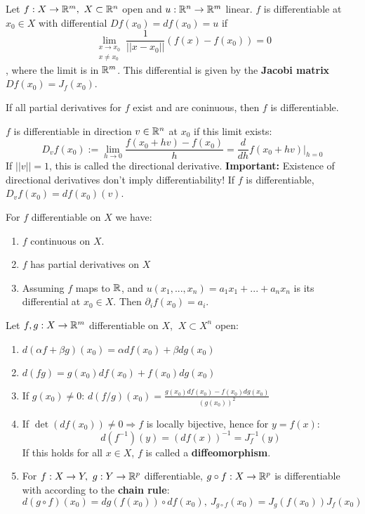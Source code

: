 \begin{definition}[Differential]
	Let $f: X \to \mathbb{R}^m, \  X \subset \mathbb{R}^n $ open and $u: \mathbb{R}^n \to \mathbb{R}^m$ linear.
	$f$ is differentiable at $x_0 \in X$ with differential $Df(x_0) = df(x_0) = u$ if
	$$\lim_{\substack{x \to x_0 \\ x \neq x_0}} \frac{1}{||x-x_0||}(f(x) - f(x_0)) = 0$$
	, where the limit is in $\mathbb{R}^m$.
	This differential is given by the \textbf{Jacobi matrix} $Df(x_0) = J_f(x_0)$.
\end{definition}

\begin{theorem}
	If all partial derivatives for $f$ exist and are coninuous, then $f$ is differentiable.
\end{theorem}

\begin{definition}
	$f$ is differentiable in direction $v\in \mathbb{R}^n$ at $x_0$ if this limit exists:
	$$D_vf(x_0) := \lim_{h\to 0} \frac{f(x_0 + hv) - f(x_0)}{h} = \frac{d}{dh}f(x_0 + hv)|_{h=0}$$
	If $||v|| = 1$, this is called the directional derivative.
	\textbf{Important:} Existence of directional derivatives don't imply differentiability!
	If $f$ is differentiable, $D_vf(x_0) = df(x_0)(v)$.
\end{definition}

\begin{proposition}
	For $f$ differentiable on $X$ we have:
	\begin{enumerate}
		\item $f$ continuous on $X$.
		\item $f$ has partial derivatives on $X$
		\item Assuming $f$ maps to $\mathbb{R}$, and $u(x_1,...,x_n) = a_1x_1 + ... + a_nx_n$ is its differential at $x_0 \in X$.
			Then $\partial_if(x_0) = a_i$.
	\end{enumerate}
\end{proposition}

\begin{proposition}
	Let $f, g: X \to \mathbb{R}^m$ differentiable on $X$, $\ X \subset X^n$ open:
	\begin{enumerate}
		\item $d(\alpha f + \beta g)(x_0) = \alpha df(x_0) + \beta dg(x_0)$
		\item $d(fg) = g(x_0)df(x_0) + f(x_0)dg(x_0)$
		\item If $g(x_0) \neq 0$: $d(f/g)(x_0) =  \frac{g(x_0)df(x_0) - f(x_0)dg(x_0)}{(g(x_0))^2}$
		\item If $\det(df(x_0)) \neq 0 \Rightarrow f$ is locally bijective, hence for $y = f(x)$:
			$$d(f^{-1})(y) = (df(x))^{-1} = J^{-1}_f(y)$$
			If this holds for all $x \in X$, $f$ is called a \textbf{diffeomorphism}. 
		\item For $f: X \to Y, \ g: Y \to \mathbb{R}^p$ differentiable, $g\circ f: X \to \mathbb{R}^p$ is differentiable with according to the \textbf{chain rule}:
			$$d(g\circ f)(x_0) = dg(f(x_0))\circ df(x_0), \ J_{g\circ f}(x_0) = J_g(f(x_0))J_f(x_0)$$
	\end{enumerate}
\end{proposition}

